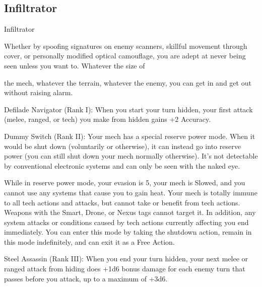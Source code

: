 \subsection{Infiltrator}

                                                    Infiltrator  

Whether by spoofing signatures on enemy scanners, skillful movement through cover, or personally  
modified optical camouflage, you are adept at never being seen unless you want to. Whatever the size of  

the mech, whatever the terrain, whatever the enemy, you can get in and get out without raising alarm.   

                                                                                                                  


Defilade Navigator (Rank I): When you start your turn hidden, your first attack (melee, ranged,  
or tech) you make from hidden gains +2 Accuracy.
 
Dummy Switch (Rank II): Your mech has a special reserve power mode. When it would be shut  
down (voluntarily or otherwise), it can instead go into reserve power (you can still shut down your  
mech normally otherwise). It’s not detectable by conventional electronic systems and can only be  
seen with the naked eye.
 
While in reserve power mode, your evasion is 5, your mech is Slowed, and you cannot use any  
systems that cause you to gain heat. Your mech is totally immune to all tech actions and attacks,  
but cannot take or benefit from tech actions. Weapons with the Smart, Drone, or Nexus tags  
cannot target it. In addition, any system attacks or conditions caused by tech actions currently  
affecting you end immediately. You can enter this mode by taking the shutdown action, remain in  
this mode indefinitely, and can exit it as a Free Action.
 
Steel Assassin (Rank III): When you end your turn hidden, your next melee or ranged attack  
from hiding does +1d6 bonus damage for each enemy turn that passes before you attack, up to  
a maximum of +3d6.